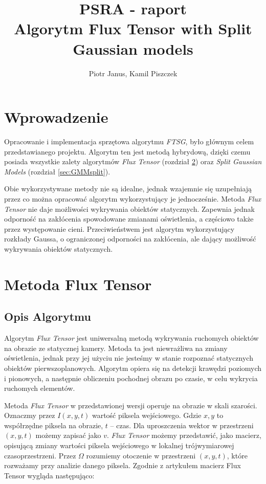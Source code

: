 \documentclass[10pt,a4paper]{article}
\begin{document}
	\title{PSRA - raport  \\  Algorytm Flux Tensor with Split Gaussian models}
	\author{Piotr Janus, Kamil Piszczek}
	\date{}
	\maketitle


\section{Wprowadzenie}

Opracowanie i implementacja sprzętowa algorytmu \textit{FTSG}, było głównym celem przedstawianego projektu. Algorytm ten jest metodą hybrydową, dzięki czemu posiada wszystkie zalety algorytmów \textit{Flux Tensor} (rozdział \ref{sec:FluxTensor_Teoria}) oraz \textit{Split Gaussian Models} (rozdział \ref{sec:GMMsplit}).   

Obie wykorzystywane metody nie są idealne, jednak wzajemnie się uzupełniają przez co można opracować algorytm wykorzystujący je jednocześnie. Metoda \textit{Flux Tensor} nie daje możliwości wykrywania obiektów statycznych. Zapewnia jednak odporność na zakłócenia spowodowane zmianami oświetlenia, a częściowo także przez występowanie cieni. Przeciwieństwem jest algorytm wykorzystujący rozkłady Gaussa, o ograniczonej odporności na zakłócenia, ale dający możliwość wykrywania obiektów statycznych. 

\section{Metoda Flux Tensor}
\label{sec:FluxTensor_Teoria}

\subsection{Opis Algorytmu}
\label{sec:FluxTensorOpis}

Algorytm \textit{Flux Tensor} jest uniwersalną metodą wykrywania ruchomych obiektów na obrazie ze statycznej kamery. Metoda ta jest niewrażliwa na zmiany oświetlenia, jednak przy jej użyciu nie jesteśmy w stanie rozpoznać statycznych obiektów pierwszoplanowych. Algorytm opiera się na detekcji krawędzi poziomych i pionowych, a następnie obliczeniu pochodnej obrazu po czasie, w celu wykrycia ruchomych elementów.

Metoda \emph{Flux Tensor} w przedstawionej wersji operuje na obrazie w skali szarości. Oznaczmy przez $I(x,y,t)$ wartość piksela wejściowego. Gdzie $x,y$ to współrzędne piksela na obrazie, $t$ – czas. Dla uproszczenia wektor w przestrzeni $(x,y,t)$ możemy zapisać jako $v$.
\textit{Flux Tensor} możemy przedstawić, jako macierz, opisującą zmiany wartości piksela wejściowego w lokalnej trójwymiarowej czasoprzestrzeni. Przez $\Omega$ rozumiemy otoczenie w przestrzeni $(x,y,t)$, które rozważamy przy analizie danego piksela. Zgodnie z artykułem \cite{wang_14} macierz Flux Tensor wygląda następująco:
 
\end{document}
